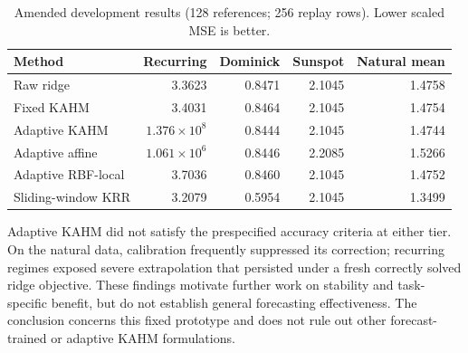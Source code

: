 \begin{table}[t]
\centering
\small
\caption{Amended development results (128 references; 256 replay rows). Lower scaled MSE is better.}
\label{tab:adaptive-large}
\begin{tabular}{lrrrr}
\hline
Method & Recurring & Dominick & Sunspot & Natural mean \\
\hline
Raw ridge & 3.3623 & 0.8471 & 2.1045 & 1.4758 \\
Fixed KAHM & 3.4031 & 0.8464 & 2.1045 & 1.4754 \\
Adaptive KAHM & $1.376\times 10^{8}$ & 0.8444 & 2.1045 & 1.4744 \\
Adaptive affine & $1.061\times 10^{6}$ & 0.8446 & 2.2085 & 1.5266 \\
Adaptive RBF-local & 3.7036 & 0.8460 & 2.1045 & 1.4752 \\
Sliding-window KRR & 3.2079 & 0.5954 & 2.1045 & 1.3499 \\
\hline
\end{tabular}
\end{table}

Adaptive KAHM did not satisfy the prespecified accuracy criteria at either tier. On the natural data, calibration frequently suppressed its correction; recurring regimes exposed severe extrapolation that persisted under a fresh correctly solved ridge objective. These findings motivate further work on stability and task-specific benefit, but do not establish general forecasting effectiveness. The conclusion concerns this fixed prototype and does not rule out other forecast-trained or adaptive KAHM formulations.
